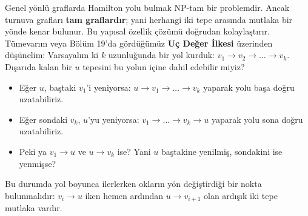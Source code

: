 Genel yönlü graflarda Hamilton yolu bulmak NP-tam bir problemdir. Ancak turnuva grafları \textbf{tam graflardır}; yani herhangi iki tepe arasında mutlaka bir yönde kenar bulunur.
Bu yapısal özellik çözümü doğrudan kolaylaştırır.
Tümevarım veya Bölüm 19'da gördüğümüz \textbf{Uç Değer İlkesi} üzerinden düşünelim:
Varsayalım ki $k$ uzunluğunda bir yol kurduk: $v_1 \to v_2 \to \dots \to v_k$.
Dışarıda kalan bir $u$ tepesini bu yolun içine dahil edebilir miyiz?
\begin{itemize}
    \item Eğer $u$, baştaki $v_1$'i yeniyorsa: $u \to v_1 \to \dots \to v_k$ yaparak yolu başa doğru uzatabiliriz.
    \item Eğer sondaki $v_k$, $u$'yu yeniyorsa: $v_1 \to \dots \to v_k \to u$ yaparak yolu sona doğru uzatabiliriz.
    \item Peki ya $v_1 \to u$ ve $u \to v_k$ ise? Yani $u$ baştakine yenilmiş, sondakini ise yenmişse?
\end{itemize}
Bu durumda yol boyunca ilerlerken okların yön değiştirdiği bir nokta bulunmalıdır: $v_i \to u$ iken hemen ardından $u \to v_{i+1}$ olan ardışık iki tepe mutlaka vardır.

